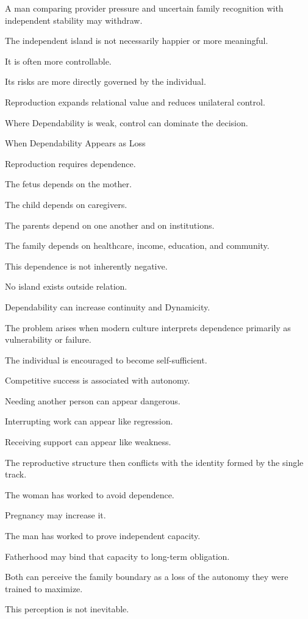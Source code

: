 A man comparing provider pressure and uncertain family recognition with independent stability may withdraw.

The independent island is not necessarily happier or more meaningful.

It is often more controllable.

Its risks are more directly governed by the individual.

Reproduction expands relational value and reduces unilateral control.

Where Dependability is weak, control can dominate the decision.

When Dependability Appears as Loss

Reproduction requires dependence.

The fetus depends on the mother.

The child depends on caregivers.

The parents depend on one another and on institutions.

The family depends on healthcare, income, education, and community.

This dependence is not inherently negative.

No island exists outside relation.

Dependability can increase continuity and Dynamicity.

The problem arises when modern culture interprets dependence primarily as vulnerability or failure.

The individual is encouraged to become self-sufficient.

Competitive success is associated with autonomy.

Needing another person can appear dangerous.

Interrupting work can appear like regression.

Receiving support can appear like weakness.

The reproductive structure then conflicts with the identity formed by the single track.

The woman has worked to avoid dependence.

Pregnancy may increase it.

The man has worked to prove independent capacity.

Fatherhood may bind that capacity to long-term obligation.

Both can perceive the family boundary as a loss of the autonomy they were trained to maximize.

This perception is not inevitable.

